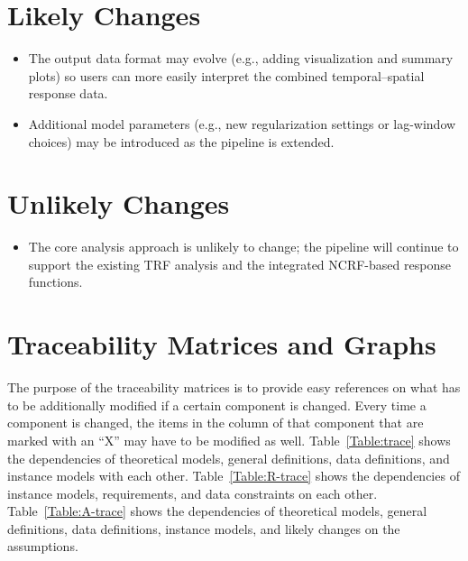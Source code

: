 \documentclass[12pt]{article}
\newcounter{lcnum} %
\begin{document}


\section{Likely Changes}

\noindent
\begin{itemize}

  \item[LC\refstepcounter{lcnum}\thelcnum\label{LC-OutputFormat}:]
    The output data format may evolve (e.g., adding visualization and summary plots)
    so users can more easily interpret the combined temporal--spatial response data.

  \item[LC\refstepcounter{lcnum}\thelcnum\label{LC-ModelParameters}:]
    Additional model parameters (e.g., new regularization settings or lag-window
    choices) may be introduced as the pipeline is extended.

\end{itemize}

\section{Unlikely Changes}

\noindent
\begin{itemize}

  \item[LC\refstepcounter{lcnum}\thelcnum\label{LC-CoreMethods}:]
    The core analysis approach is unlikely to change; the pipeline will continue to
    support the existing TRF analysis and the integrated NCRF-based response
    functions.

\end{itemize}

\section{Traceability Matrices and Graphs}

The purpose of the traceability matrices is to provide easy references on what
has to be additionally modified if a certain component is changed.  Every time a
component is changed, the items in the column of that component that are marked
with an ``X'' may have to be modified as well.  Table~\ref{Table:trace} shows the
dependencies of theoretical models, general definitions, data definitions, and
instance models with each other. Table~\ref{Table:R-trace} shows the
dependencies of instance models, requirements, and data constraints on each
other. Table~\ref{Table:A-trace} shows the dependencies of theoretical models,
general definitions, data definitions, instance models, and likely changes on
the assumptions.
\end{document}

